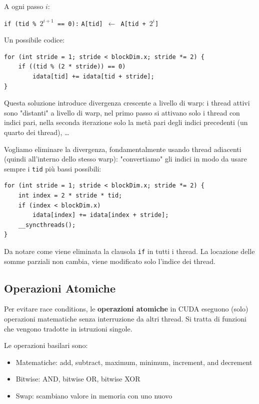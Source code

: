 A ogni passo $i$:
\begin{center}
    \texttt{if (tid \% $2^{i+1}$ == 0):} \texttt{A[tid] $\leftarrow$ A[tid + $2^i$]}
\end{center}

Un possibile codice:
\begin{verbatim}
for (int stride = 1; stride < blockDim.x; stride *= 2) {
    if ((tid % (2 * stride)) == 0)
        idata[tid] += idata[tid + stride];
}
\end{verbatim}

Questa soluzione introduce divergenza crescente a livello di warp: i thread attivi sono "distanti" a livello di warp, nel primo passo si attivano solo i thread con indici pari, nella seconda iterazione solo la metà pari degli indici precedenti (un quarto dei thread), \dots

Vogliamo eliminare la divergenza, fondamentalmente usando thread adiacenti (quindi all'interno dello stesso warp): "convertiamo" gli indici in modo da usare sempre i \texttt{tid} più bassi possibili:
\begin{verbatim}
for (int stride = 1; stride < blockDim.x; stride *= 2) {
    int index = 2 * stride * tid;
    if (index < blockDim.x)
        idata[index] += idata[index + stride];
    __syncthreads();
}
\end{verbatim}

Da notare come viene eliminata la clausola \texttt{if} in tutti i thread. La locazione delle somme parziali non cambia, viene modificato solo l'indice dei thread.

\subsection{Operazioni Atomiche}

Per evitare race conditions, le \textbf{operazioni atomiche} in CUDA eseguono (solo) operazioni matematiche senza interruzione da altri thread. Si tratta di funzioni che vengono tradotte in istruzioni singole.

Le operazioni basilari sono:
\begin{itemize}
	\item Matematiche: add, subtract, maximum, minimum, increment, and decrement
	
	\item Bitwise: AND, bitwise OR, bitwise XOR
	
	\item Swap: scambiano valore in memoria con uno nuovo
\end{itemize}

